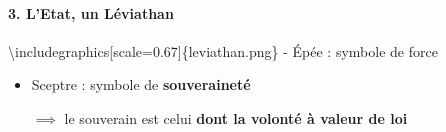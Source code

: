 \documentclass[
]{scrartcl}
\begin{document}
\hypertarget{letat-un-luxe9viathan}{%
\paragraph{3. L'Etat, un Léviathan}\label{letat-un-luxe9viathan}}

\textbackslash includegraphics{[}scale=0.67{]}\{leviathan.png\} - Épée :
symbole de force

\begin{itemize}
\item
  Sceptre : symbole de \textbf{souveraineté}

  \(\implies\) le souverain est celui \textbf{dont la volonté à valeur
  de loi}
\end{itemize}
\end{document}
